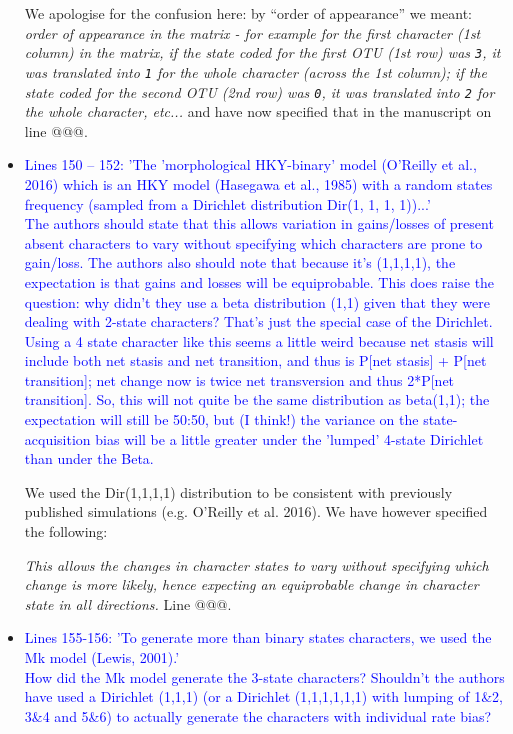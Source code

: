 \documentclass[12pt,letterpaper]{article}
\begin{document}
\begin{itemize}
We apologise for the confusion here: by ``order of appearance'' we meant:
\textit{order of appearance in the matrix - for example for the first character (1st column) in the matrix, if the state coded for the first OTU (1st row) was \texttt{3}, it was translated into \texttt{1} for the whole character (across the 1st column); if the state coded for the second OTU (2nd row) was \texttt{0}, it was translated into \texttt{2} for the whole character, etc...} and have now specified that in the manuscript on line @@@.



\item{\textcolor{blue}{Lines 150 – 152: 'The 'morphological HKY-binary' model (O'Reilly et al.,
2016) which is an HKY model (Hasegawa et al., 1985) with a random states frequency (sampled from a Dirichlet distribution Dir(1, 1, 1, 1))...'
\\
The authors should state that this allows variation in gains/losses of present absent characters to vary without specifying which characters are prone to gain/loss. The authors also should note that because it's (1,1,1,1), the expectation is that gains and losses will be equiprobable. This does raise the question: why didn't they use a beta distribution (1,1) given that they were dealing with 2-state characters? That's just the special case of the Dirichlet. Using a 4 state character like this seems a little weird because net stasis will include both net stasis and net transition, and thus is P[net stasis] + P[net transition]; net change now is twice net transversion and thus 2*P[net transition]. So, this will not quite be the same distribution as beta(1,1); the expectation will still be 50:50, but (I think!) the variance on the state-acquisition bias will be a little greater under the 'lumped' 4-state Dirichlet than under the Beta.}}

We used the Dir(1,1,1,1) distribution to be consistent with previously published simulations (e.g. O'Reilly et al. 2016).
We have however specified the following:

\textit{This allows the changes in character states to vary without specifying which change is more likely, hence expecting an equiprobable change in character state in all directions.} Line @@@.



\item{\textcolor{blue}{Lines 155-156: 'To generate more than binary states characters, we used the Mk model (Lewis, 2001).'
\\
How did the Mk model generate the 3-state characters? Shouldn't the authors have used a Dirichlet (1,1,1) (or a Dirichlet (1,1,1,1,1,1) with lumping of 1\&2, 3\&4 and 5\&6) to actually generate the characters with individual rate bias?}}


\end{itemize}
\end{document}
